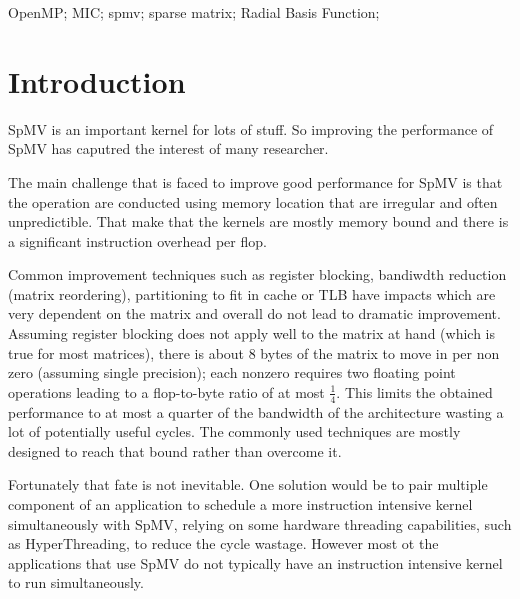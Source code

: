 \documentclass[10pt, conference, compsocconf]{IEEEtran}
\begin{document}
\begin{IEEEkeywords}
OpenMP; MIC; spmv; sparse matrix; Radial Basis Function;
\end{IEEEkeywords}

\IEEEpeerreviewmaketitle



\section{Introduction}
\cite{Bell08, Vuduc05, Nishtala07, Stock12-TACC, Cuthill69, cramer2012openmp, Buluc2009_SPAA, Buluc11, Im01, Mellor-Crummey04, Nishtala07, Saad94sparskit, Williams07}
\cite{Temam:1992:CBS:147877.148091}
\cite{DBLP:journals/ijhpca/ShantharamCR11,
conf/ppsc/Toledo97, Liu:2013:ESM:2464996.2465013, Molka:2009:MPC:1636712.1637764,%
DBLP:journals/corr/abs-1101-0091, conf/ipps/BulucWOD11, conf/ipps/KreutzerHWFBB12,%
kumar2012accelerating, journals/concurrency/VazquezFG11}


SpMV is an important kernel for lots of stuff. So improving the
performance of SpMV has caputred the interest of many researcher.

The main challenge that is faced to improve good performance for SpMV
is that the operation are conducted using memory location that are
irregular and often unpredictible. That make that the kernels are
mostly memory bound and there is a significant instruction overhead
per flop.

Common improvement techniques such as register blocking, bandiwdth
reduction (matrix reordering), partitioning to fit in cache or TLB
have impacts which are very dependent on the matrix and overall do not
lead to dramatic improvement. Assuming register blocking does not
apply well to the matrix at hand (which is true for most matrices),
there is about 8 bytes of the matrix to move in per non zero (assuming
single precision); each nonzero requires two floating point operations
leading to a flop-to-byte ratio of at most $\frac{1}{4}$. This limits
the obtained performance to at most a quarter of the bandwidth of the
architecture wasting a lot of potentially useful cycles. The commonly
used techniques are mostly designed to reach that bound rather than
overcome it.

Fortunately that fate is not inevitable. One solution would be to pair
multiple component of an application to schedule a more instruction
intensive kernel simultaneously with SpMV, relying on some hardware
threading capabilities, such as HyperThreading, to reduce the cycle
wastage. However most ot the applications that use SpMV do not
typically have an instruction intensive kernel to run simultaneously.
\end{document}
